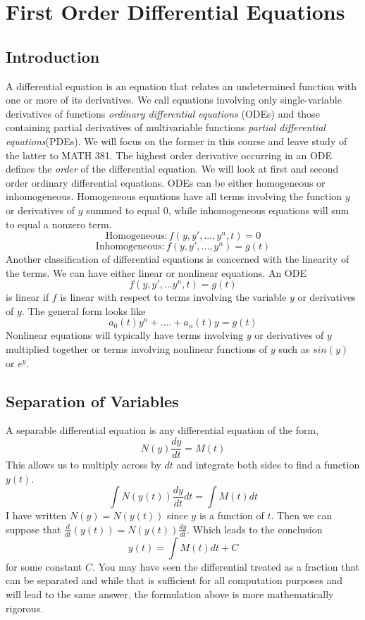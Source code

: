 \chapter{First Order Differential Equations}
\setcounter{exercisecounter}{0}

\setcounter{thmcounter}{1}
\section{Introduction}
A differential equation is an equation that relates an undetermined function with one or more of its derivatives. We call equations involving only single-variable derivatives of functions \textit{ordinary differential equations} (ODEs) and those containing partial derivatives of multivariable functions \textit{partial differential equations}(PDEs). We will focus on the former in this course and leave study of the latter to MATH 381. \newline
\newline
The highest order derivative occurring in an ODE defines the \textit{order} of the differential equation. We will look at first and second order ordinary differential equations. ODEs can be either homogeneous or inhomogeneous. Homogeneous equations have all terms involving the function $y$ or derivatives of $y$ summed to equal $0$, while inhomogeneous equations will sum to equal a nonzero term. 
\[\mbox{Homogeneous}: f(y, y',...,y^n, t) = 0\]
\[\mbox{Inhomogeneous}: f(y, y',...,y^n) = g(t)\]
\newline
Another classification of differential equations is concerned with the linearity of the terms. We can have either linear or nonlinear equations. An ODE
\[f(y, y',...y^n,t) = g(t)\]
is linear if $f$ is linear with respect to terms involving the variable $y$ or derivatives of $y$. The general form looks like
\[a_0(t)y^n+....+a_n(t)y = g(t)\]
Nonlinear equations will typically have terms involving $y$ or derivatives of $y$ multiplied together or terms involving nonlinear functions of $y$ such as $sin(y)$ or $e^y$.
\newline


\section{Separation of Variables}
A separable differential equation is any differential equation of the form,
\[N(y)\frac{dy}{dt} = M(t)\]
This allows us to multiply across by $dt$ and integrate both sides to find a function $y(t)$. 
\[\int N(y(t))\frac{dy}{dt}dt = \int M(t)dt\]
I have written $N(y) = N(y(t))$ since $y$ is a function of $t$. Then we can suppose that $\frac{d}{dt}(y(t)) = N(y(t))\frac{dy}{dt}$. Which leads to the conclusion
\[y(t) = \int M(t)dt + C\]
for some constant $C$. You may have seen the differential treated as a fraction that can be separated and while that is sufficient for all computation purposes and will lead to the same answer, the formulation above is more mathematically rigorous. 


